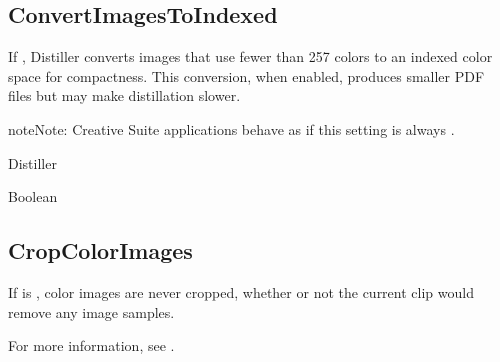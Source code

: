 \documentclass[letterpaper,12pt,english,openany,oneside]{sphinxmanual}
\begin{document}
\begin{sphinxVerbatim}[commandchars=\\\{\}]
\end{sphinxVerbatim}




\subsection{ConvertImagesToIndexed}
\label{\detokenize{PDF_Create_CommonSettings:convertimagestoindexed}}
If  , Distiller converts images that use fewer than 257 colors to an indexed color space for compactness. This conversion, when enabled, produces smaller PDF files but may make distillation slower.

\begin{sphinxadmonition}{note}{Note:}
Creative Suite applications behave as if this setting is always  .
\end{sphinxadmonition}
\label{\detokenize{PDF_Create_CommonSettings:supported-by-30}}

Distiller

\label{\detokenize{PDF_Create_CommonSettings:type-30}}

Boolean

\label{\detokenize{PDF_Create_CommonSettings:default-value-27}}

\begin{sphinxVerbatim}[commandchars=\\\{\}]
\end{sphinxVerbatim}




\subsection{CropColorImages}
\label{\detokenize{PDF_Create_CommonSettings:cropcolorimages}}
If  is  , color images are never cropped, whether or not the current clip would remove any image samples.

For more information, see .

\label{\detokenize{PDF_Create_CommonSettings:supported-by-31}}
\end{document}
